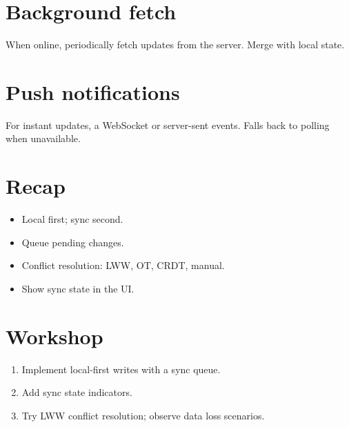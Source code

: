 \section{Background fetch}

When online, periodically fetch updates from the server.
Merge with local state.

\section{Push notifications}

For instant updates, a WebSocket or server-sent events.
Falls back to polling when unavailable.

\section{Recap}

\begin{recap}
\begin{itemize}[leftmargin=*]
  \item Local first; sync second.
  \item Queue pending changes.
  \item Conflict resolution: LWW, OT, CRDT, manual.
  \item Show sync state in the UI.
\end{itemize}
\end{recap}

\section*{Workshop}

\begin{enumerate}[leftmargin=*]
  \item Implement local-first writes with a sync queue.
  \item Add sync state indicators.
  \item Try LWW conflict resolution; observe data loss
    scenarios.
\end{enumerate}
